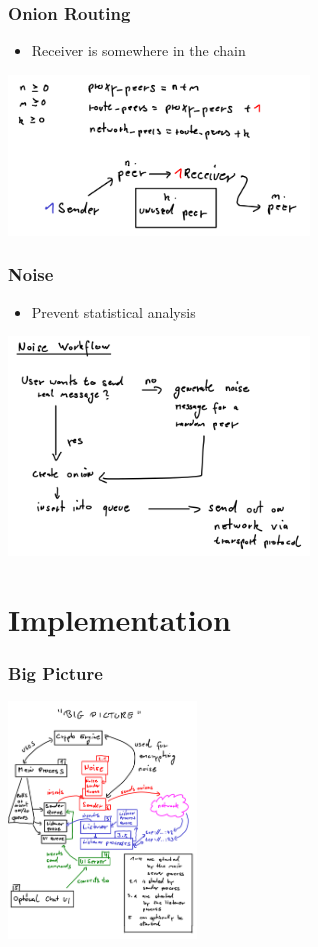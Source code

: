 \documentclass{beamer}
\begin{document}
\frame
{
  \frametitle{Onion Routing}
  \begin{itemize}
      \item Receiver is somewhere in the chain
   \end{itemize}
  \begin{center}
   \includegraphics[width=8cm]{../onionrouting.png}
  \end{center}
}

\frame
{
  \frametitle{Noise}
  \begin{itemize}
      \item Prevent statistical analysis
   \end{itemize}
  \begin{center}
   \includegraphics[width=8cm]{../noiseworkflow.png}
  \end{center}
}


\section{Implementation}
\frame
{
  \frametitle{Big Picture}
  \begin{center}
   \includegraphics[width=5cm]{../bigpicture.png}
  \end{center}
}
\end{document}
